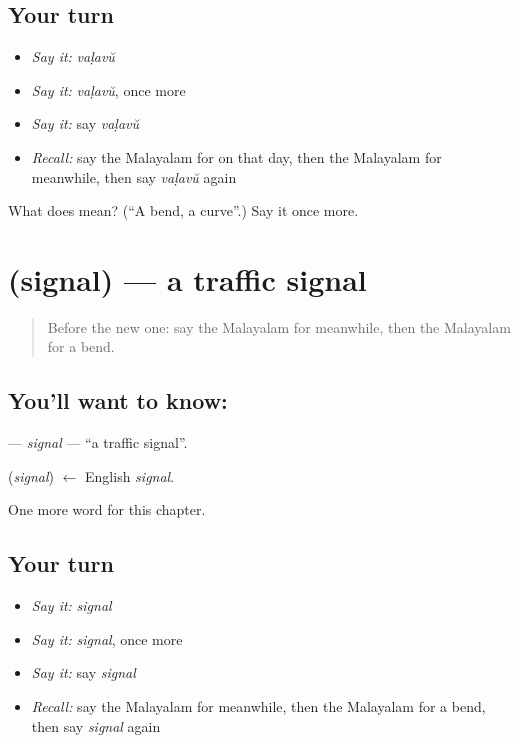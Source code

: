 \subsection*{Your turn}
\begin{itemize}
\raggedright
  \item \emph{Say it:} \emph{vaḷavŭ}
  \item \emph{Say it:} \emph{vaḷavŭ}, once more
  \item \emph{Say it:} say \emph{vaḷavŭ}
  \item \emph{Recall:} say the Malayalam for on that day, then the Malayalam for meanwhile, then say \emph{vaḷavŭ} again
\end{itemize}

\begin{tcolorbox}[breakable,colback=teal!4,colframe=teal!35!black,title={Before you move on}]
What does  mean? (\textquotedblleft{}A bend, a curve\textquotedblright{}.) Say it once more.
\end{tcolorbox}
\section[\texorpdfstring{\ml{സിഗ്നൽ} (signal)}{സിഗ്നൽ (signal)}]{ (signal) — a traffic signal}

\label{lesson:ML-C278-signal}



\begin{quote}
Before the new one: say the Malayalam for meanwhile, then the Malayalam for a bend.
\end{quote}

\subsection*{You'll want to know: }
\textbf{} — \emph{signal} — \textquotedblleft{}a traffic signal\textquotedblright{}.

\begin{cousinweb}
\textbf{} (\emph{signal}) $\leftarrow$ English \emph{signal}.
\end{cousinweb}

\begin{grammarlens}[title={What you've built}]
One more word for this chapter.
\end{grammarlens}

\subsection*{Your turn}
\begin{itemize}
\raggedright
  \item \emph{Say it:} \emph{signal}
  \item \emph{Say it:} \emph{signal}, once more
  \item \emph{Say it:} say \emph{signal}
  \item \emph{Recall:} say the Malayalam for meanwhile, then the Malayalam for a bend, then say \emph{signal} again
\end{itemize}

